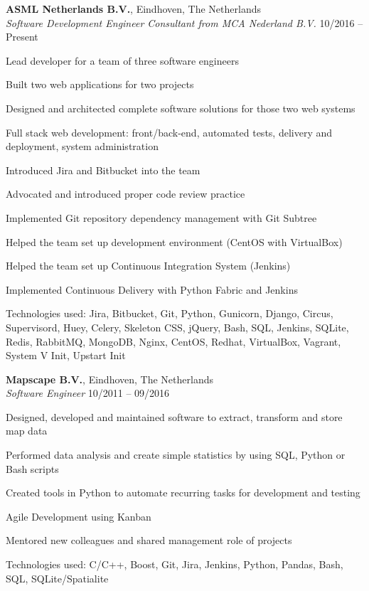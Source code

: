 \documentclass[margin,line]{resume}
\begin{document}
\begin{resume}
    \textbf{ASML Netherlands B.V.}, Eindhoven, The Netherlands \\
    \textsl{Software Development Engineer Consultant from MCA Nederland B.V.} \hfill 10/2016 -- Present \vspace{-3mm}\\\vspace{-1mm}%
      \begin{list2}
      \item Lead developer for a team of three software engineers
      \item Built two web applications for two projects
      \item Designed and architected complete software solutions for those two web systems
      \item Full stack web development: front/back-end, automated tests, delivery and deployment, \newline system administration
      \item Introduced Jira and Bitbucket into the team
      \item Advocated and introduced proper code review practice
      \item Implemented Git repository dependency management with Git Subtree
      \item Helped the team set up development environment (CentOS with VirtualBox)
      \item Helped the team set up Continuous Integration System (Jenkins)
      \item Implemented Continuous Delivery with Python Fabric and Jenkins
      \item Technologies used: Jira, Bitbucket, Git, Python, Gunicorn, Django, Circus, Supervisord, Huey, Celery, Skeleton CSS, jQuery,
            Bash, SQL, Jenkins, SQLite, Redis, RabbitMQ, MongoDB, Nginx, CentOS, Redhat, VirtualBox, Vagrant, System V Init, Upstart Init
      \end{list2}

    \textbf{Mapscape B.V.}, Eindhoven, The Netherlands \\
    \textsl{Software Engineer} \hfill 10/2011 -- 09/2016 \vspace{-3mm}\\\vspace{-1mm}%
      \begin{list2}
      \item Designed, developed and maintained software to extract, transform and store map data
      \item Performed data analysis and create simple statistics by using SQL, Python or Bash scripts
      \item Created tools in Python to automate recurring tasks for development and testing
      \item Agile Development using Kanban
      \item Mentored new colleagues and shared management role of projects
      \item Technologies used: C/C++, Boost, Git, Jira, Jenkins, Python, Pandas, Bash, SQL, SQLite/Spatialite
      \end{list2}


\end{resume}
\end{document}
